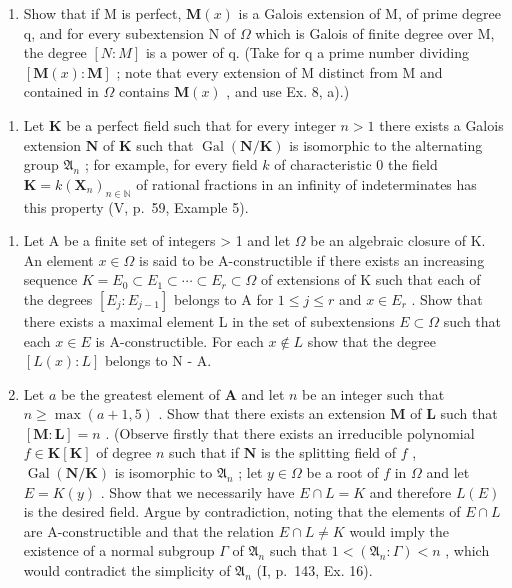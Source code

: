 \begin{enumerate}
\def\labelenumi{\alph{enumi})}
\setcounter{enumi}{1}
\tightlist
\item
  Show that if M is perfect, \(\mathbf{M}(x)\) is a Galois extension of M, of prime degree q, and for every subextension N of \(\Omega\) which is Galois of finite degree over M, the degree \([N:M]\) is a power of q. (Take for q a prime number dividing \([\mathbf{M}(x):\mathbf{M}]\) ; note that every extension of M distinct from M and contained in \(\Omega\) contains \(\mathbf{M}(x)\) , and use Ex. 8, a).)
\end{enumerate}

\begin{enumerate}
\def\labelenumi{\arabic{enumi})}
\setcounter{enumi}{9}
\tightlist
\item
  Let \(\mathbf{K}\) be a perfect field such that for every integer \(n > 1\) there exists a Galois extension \(\mathbf{N}\) of \(\mathbf{K}\) such that \(\operatorname{Gal}(\mathbf{N} / \mathbf{K})\) is isomorphic to the alternating group \(\mathfrak{A}_n\) ; for example, for every field \(k\) of characteristic 0 the field \(\mathbf{K} = k(\mathbf{X}_n)_{n \in \mathbb{N}}\) of rational fractions in an infinity of indeterminates has this property (V, p.~59, Example 5).
\end{enumerate}

\begin{enumerate}
\def\labelenumi{\alph{enumi})}
\item
  Let A be a finite set of integers \textgreater{} 1 and let \(\Omega\) be an algebraic closure of K. An element \(x \in \Omega\) is said to be A-constructible if there exists an increasing sequence \(K = E_{0} \subset E_{1} \subset \cdots \subset E_{r} \subset \Omega\) of extensions of K such that each of the degrees \([E_{j}: E_{j-1}]\) belongs to A for \(1 \leqslant j \leqslant r\) and \(x \in E_{r}\) . Show that there exists a maximal element L in the set of subextensions \(E \subset \Omega\) such that each \(x \in E\) is A-constructible. For each \(x \notin L\) show that the degree \([L(x): L]\) belongs to N - A.
\item
  Let \(a\) be the greatest element of \(\mathbf{A}\) and let \(n\) be an integer such that \(n \geqslant \max (a + 1,5)\) . Show that there exists an extension \(\mathbf{M}\) of \(\mathbf{L}\) such that \([\mathbf{M}:\mathbf{L}] = n\) . (Observe firstly that there exists an irreducible polynomial \(f \in \mathbf{K}[\mathbf{K}]\) of degree \(n\) such that if \(\mathbf{N}\) is the splitting field of \(f\) , \(\operatorname{Gal}(\mathbf{N} / \mathbf{K})\) is isomorphic to \(\mathfrak{A}_n\) ; let \(y \in \Omega\) be a root of \(f\) in \(\Omega\) and let \(E = K(y)\) . Show that we necessarily have \(E \cap L = K\) and therefore \(L(E)\) is the desired field. Argue by contradiction, noting that the elements of \(E \cap L\) are A-constructible and that the relation \(E \cap L \neq K\) would imply the existence of a normal subgroup \(\Gamma\) of \(\mathfrak{A}_n\) such that \(1 < (\mathfrak{A}_n:\Gamma) < n\) , which would contradict the simplicity of \(\mathfrak{A}_n\) (I, p.~143, Ex. 16).
\end{enumerate}

